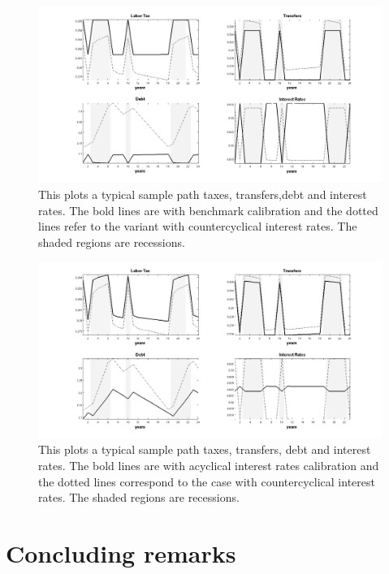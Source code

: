\documentclass[thmsb,11pt]{article}
\begin{document}
{\begin{figure}[htp]
\includegraphics[width=\textwidth]{Draft25Graphs/DiscoutFactorComparison.png}
\caption{This plots a typical sample path taxes, transfers,debt and interest rates. The bold lines are with  benchmark calibration and the dotted lines refer to the variant with countercyclical interest rates. The shaded regions are recessions.}
\label{fig:DiscoutFactorComparison}
\end{figure}

\begin{figure}[htp]
\centering
\includegraphics[width=\textwidth]{Draft25Graphs/DiscoutFactorComparison2.png}
\caption{This plots a typical sample path taxes, transfers, debt and interest rates.  The bold lines  are with acyclical interest rates calibration and the dotted lines correspond to the case with countercyclical interest rates. The shaded regions are recessions.}
\label{fig:DiscoutFactorComparison2}
\end{figure}

\smallskip


\section{Concluding remarks\label{sec:conclude}}

}
\end{document}
